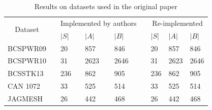\documentclass[pdftex, 12pt, a4paper]{article}
\begin{document}
\begin{table}[]
\centering
\caption{Results on datasets used in the original paper}
\label{tab:main_results}
\begin{tabular}{@{}lllllllll@{}}
\toprule
\multicolumn{1}{c}{\multirow{2}{*}{Dataset}} &  & \multicolumn{3}{c}{Implemented   by authors} &  & \multicolumn{3}{c}{Re-implemented} \\ \cmidrule(lr){3-5} \cmidrule(l){7-9} 
\multicolumn{1}{c}{}                         &  & $|S|$ \qquad \quad        & $|A|$ \qquad \quad         & $|B|$           &  & $|S|$\qquad \quad       & $|A|$ \qquad \quad       & $|B|$       \\ \midrule
BCSPWR09                                     &  & 20           & 857           & 846           &  & 20        & 857        & 846       \\
BCSPWR10                                     &  & 31           & 2623          & 2646          &  & 31        & 2623       & 2646      \\
BCSSTK13                                     &  & 236          & 862           & 905           &  & 236       & 862        & 905       \\
CAN 1072                                     &  & 33           & 525           & 514           &  & 33        & 525        & 514       \\
JAGMESH                                      &  & 26           & 442           & 468           &  & 26        & 442        & 468       \\ \bottomrule
\end{tabular}
\end{table}


\printbibliography[title={References}]
\end{document}
